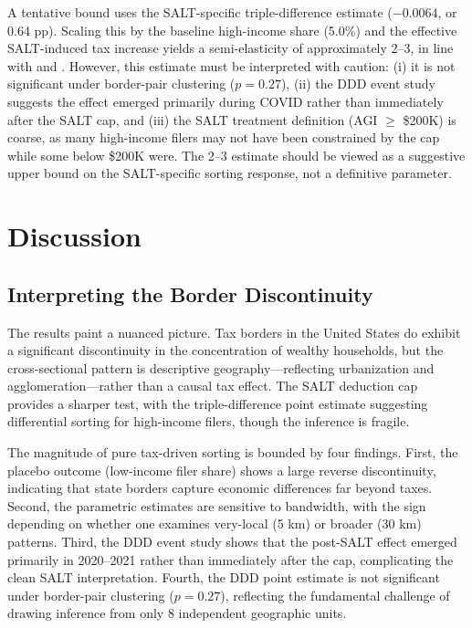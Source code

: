 \documentclass[12pt]{article}
\begin{document}
A tentative bound uses the SALT-specific triple-difference estimate ($-0.0064$, or 0.64 pp). Scaling this by the baseline high-income share (5.0\%) and the effective SALT-induced tax increase yields a semi-elasticity of approximately 2--3, in line with \citet{young2016millionaire} and \citet{moretti2017effect}. However, this estimate must be interpreted with caution: (i) it is not significant under border-pair clustering ($p = 0.27$), (ii) the DDD event study suggests the effect emerged primarily during COVID rather than immediately after the SALT cap, and (iii) the SALT treatment definition (AGI $\geq$ \$200K) is coarse, as many high-income filers may not have been constrained by the cap while some below \$200K were. The 2--3 estimate should be viewed as a suggestive upper bound on the SALT-specific sorting response, not a definitive parameter.


\section{Discussion}
\label{sec:discussion}

\subsection{Interpreting the Border Discontinuity}

The results paint a nuanced picture. Tax borders in the United States do exhibit a significant discontinuity in the concentration of wealthy households, but the cross-sectional pattern is descriptive geography---reflecting urbanization and agglomeration---rather than a causal tax effect. The SALT deduction cap provides a sharper test, with the triple-difference point estimate suggesting differential sorting for high-income filers, though the inference is fragile.

The magnitude of pure tax-driven sorting is bounded by four findings. First, the placebo outcome (low-income filer share) shows a large reverse discontinuity, indicating that state borders capture economic differences far beyond taxes. Second, the parametric estimates are sensitive to bandwidth, with the sign depending on whether one examines very-local (5 km) or broader (30 km) patterns. Third, the DDD event study shows that the post-SALT effect emerged primarily in 2020--2021 rather than immediately after the cap, complicating the clean SALT interpretation. Fourth, the DDD point estimate is not significant under border-pair clustering ($p = 0.27$), reflecting the fundamental challenge of drawing inference from only 8 independent geographic units.
\end{document}
